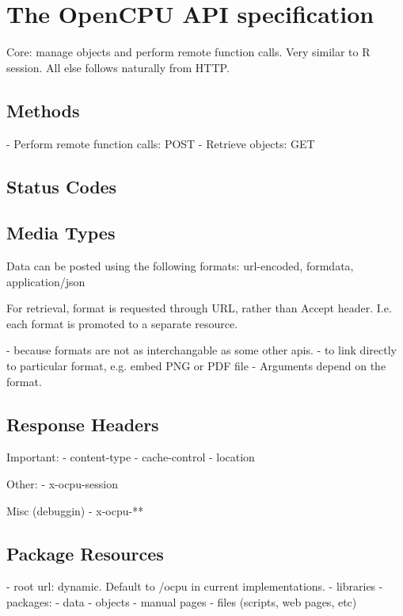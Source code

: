 \documentclass{article}
\begin{document}
\section{The OpenCPU API specification}

Core: manage objects and perform remote function calls. Very similar to R session.
All else follows naturally from HTTP.

\subsection{Methods}

- Perform remote function calls: POST
- Retrieve objects: GET

\subsection{Status Codes}

\subsection{Media Types}

Data can be posted using the following formats:
url-encoded, formdata, application/json

For retrieval, format is requested through URL, rather than Accept header.
I.e. each format is promoted to a separate resource. 

 - because formats are not as interchangable as some other apis. 
 - to link directly to particular format, e.g. embed PNG or PDF file
 - Arguments depend on the format. 

\subsection{Response Headers}

Important:
- content-type
- cache-control
- location

Other:
- x-ocpu-session

Misc (debuggin)
- x-ocpu-**

\subsection{Package Resources}

 - root url: dynamic. Default to /ocpu in current implementations.  
 - libraries
   - packages:
     - data
     - objects
     - manual pages
     - files (scripts, web pages, etc)
     
\end{document}
